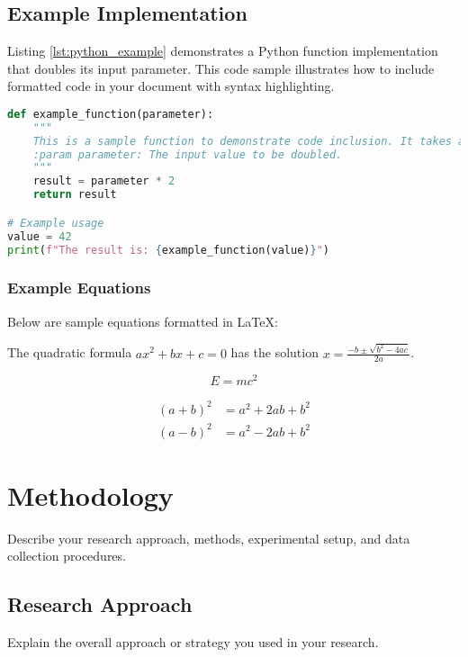 
\section{Example Implementation}
Listing \ref{lst:python_example} demonstrates a Python function implementation that doubles its input parameter. This code sample illustrates how to include formatted code in your document with syntax highlighting.

\begin{lstlisting}[language=Python, caption=Example Python Code, breaklines=true, label=lst:python_example]
def example_function(parameter):
    """
    This is a sample function to demonstrate code inclusion. It takes a parameter and returns its double.
    :param parameter: The input value to be doubled.
    """
    result = parameter * 2
    return result

# Example usage
value = 42
print(f"The result is: {example_function(value)}")
\end{lstlisting}

\subsection{Example Equations}
Below are sample equations formatted in LaTeX:

The quadratic formula $ax^2 + bx + c = 0$ has the solution $x = \frac{-b \pm \sqrt{b^2 - 4ac}}{2a}$.

\begin{equation}
    E = mc^2
\end{equation}

\begin{align}
    (a+b)^2 &= a^2 + 2ab + b^2\\
    (a-b)^2 &= a^2 - 2ab + b^2
\end{align}

\chapter{Methodology}
Describe your research approach, methods, experimental setup, and data collection procedures.

\section{Research Approach}
Explain the overall approach or strategy you used in your research.

